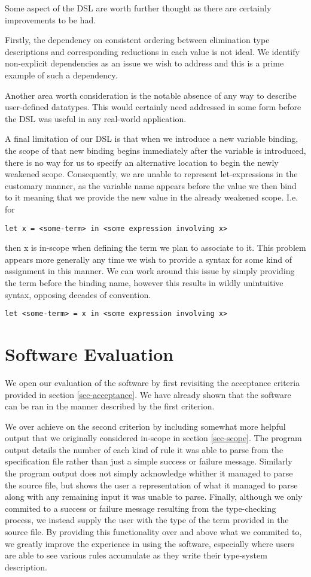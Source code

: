 Some aspect of the DSL are worth further thought as there are
certainly improvements to be had.

Firstly, the dependency on consistent ordering between elimination
type descriptions and corresponding reductions in each value is not
ideal. We identify non-explicit dependencies as an issue we wish to
address and this is a prime example of such a dependency.

Another area worth consideration is the notable absence of any way to
describe user-defined datatypes. This would certainly need addressed
in some form before the DSL was useful in any real-world application.

A final limitation of our DSL is that when we introduce a new variable
binding, the scope of that new binding begins immediately after the
variable is introduced, there is no way for us to specify an
alternative location to begin the newly weakened scope. Consequently,
we are unable to represent let-expressions in the customary manner, as
the variable name appears before the value we then bind to it meaning
that we provide the new value in the already weakened scope. I.e. for
\begin{verbatim}
let x = <some-term> in <some expression involving x>
\end{verbatim}
then x is in-scope when defining the term we plan to associate to
it. This problem appears more generally any time we wish to provide a
syntax for some kind of assignment in this manner. We can work around
this issue by simply providing the term before the binding name,
however this results in wildly unintuitive syntax, opposing decades of
convention.
\begin{verbatim}
let <some-term> = x in <some expression involving x>
\end{verbatim}

\section{Software Evaluation}

We open our evaluation of the software by first revisiting the
acceptance criteria provided in section \ref{sec-acceptance}. We have
already shown that the software can be ran in the manner described by
the first criterion.

We over achieve on the second criterion by including somewhat more
helpful output that we originally considered in-scope in section
\ref{sec-scope}. The program output details the number of each kind of
rule it was able to parse from the specification file rather than just
a simple success or failure message. Similarly the program output does
not simply acknowledge whither it managed to parse the source file,
but shows the user a representation of what it managed to parse along
with any remaining input it was unable to parse. Finally, although we
only commited to a success or failure message resulting from the
type-checking process, we instead supply the user with the type of the
term provided in the source file. By providing this functionality over
and above what we commited to, we greatly improve the experience in
using the software, especially where users are able to see various
rules accumulate as they write their type-system description.

